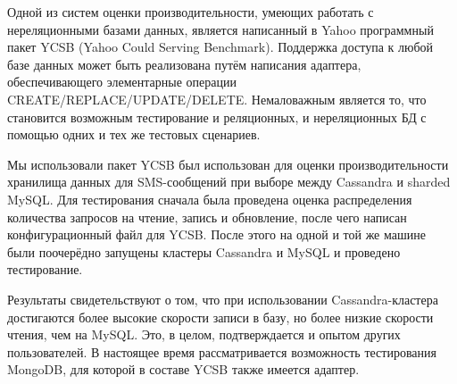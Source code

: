 \documentclass[10pt, a5paper]{article}
\begin{document}
Одной из систем оценки производительности, умеющих работать с
нереляционными базами данных, является написанный в Yahoo программный
пакет YCSB (Yahoo Could Serving Benchmark). Поддержка доступа к любой
базе данных может быть реализована путём написания адаптера,
обеспечивающего элементарные операции CREATE/REPLACE/UPDATE/DELETE.
Немаловажным является то, что становится возможным тестирование и
реляционных, и нереляционных БД с помощью одних и тех же тестовых сценариев.

Мы использовали пакет YCSB был использован для оценки
производительности хранилища данных для SMS-сообщений при выборе между
Cassandra и sharded MySQL. Для тестирования сначала была проведена
оценка распределения количества запросов на чтение, запись и обновление,
после чего написан конфигурационный файл для YCSB. После этого на одной
и той же машине были поочерёдно запущены кластеры Cassandra и MySQL и
проведено тестирование.

Результаты свидетельствуют о том, что при использовании
\linebreak Cassandra-кластера достигаются более высокие скорости записи в базу, но
более низкие скорости чтения, чем на MySQL. Это, в целом, подтверждается
и опытом других пользователей. В настоящее время рассматривается
возможность тестирования MongoDB, для которой в составе YCSB также
имеется адаптер.
\end{document}
